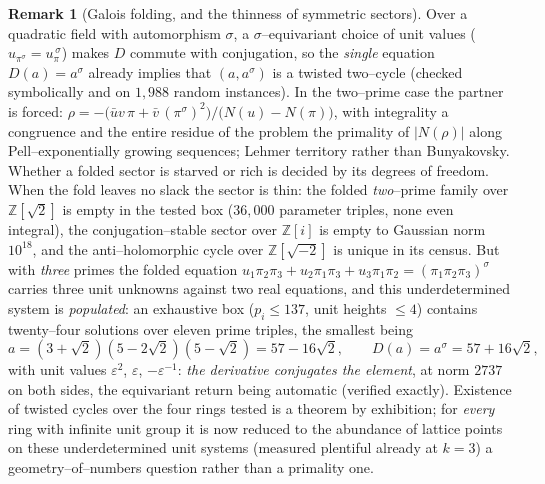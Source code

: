 \documentclass[11pt]{article}
\theoremstyle{definition}
\newtheorem{remark}[theorem]{Remark}
\begin{document}
\begin{remark}[Galois folding, and the thinness of symmetric sectors]\label{rem:folding}
Over a quadratic field with automorphism $\sigma$, a $\sigma$--equivariant choice of unit values
($u_{\pi^\sigma}=u_\pi^{\,\sigma}$) makes $D$ commute with conjugation, so the \emph{single} equation
$D(a)=a^\sigma$ already implies that $(a,a^\sigma)$ is a twisted two--cycle (checked symbolically and on
$1{,}988$ random instances). In the two--prime case the partner is forced:
$\rho=-\bigl(\bar u v\,\pi+\bar v\,(\pi^\sigma)^2\bigr)/\bigl(N(u)-N(\pi)\bigr)$, with integrality a
congruence and the entire residue of the problem the primality of $|N(\rho)|$ along Pell--exponentially
growing sequences; Lehmer territory rather than Bunyakovsky. Whether a folded sector is starved or
rich is decided by its degrees of freedom. When the fold leaves no slack the sector is thin: the folded
\emph{two}--prime family over $\mathbb{Z}[\sqrt2]$ is empty in the tested box ($36{,}000$ parameter
triples, none even integral), the conjugation--stable sector over $\mathbb{Z}[i]$ is empty to Gaussian
norm $10^{18}$, and the anti--holomorphic cycle over $\mathbb{Z}[\sqrt{-2}]$ is unique in its census.
But with \emph{three} primes the folded equation
$u_1\pi_2\pi_3+u_2\pi_1\pi_3+u_3\pi_1\pi_2=(\pi_1\pi_2\pi_3)^\sigma$ carries three unit unknowns against
two real equations, and this underdetermined system is \emph{populated}: an exhaustive box ($p_i\le137$,
unit heights $\le4$) contains twenty--four solutions over eleven prime triples, the smallest being
\[ a=(3+\sqrt2)(5-2\sqrt2)(5-\sqrt2)=57-16\sqrt2,\qquad D(a)=a^\sigma=57+16\sqrt2, \]
with unit values $\varepsilon^2$, $\varepsilon$, $-\varepsilon^{-1}$: \emph{the derivative conjugates the
element}, at norm $2737$ on both sides, the equivariant return being automatic (verified exactly).
Existence of twisted cycles over the four rings tested is a theorem by exhibition; for \emph{every} ring
with infinite unit group it is now reduced to the abundance of lattice points on these underdetermined
unit systems (measured plentiful already at $k=3$) a geometry--of--numbers question rather than a
primality one.
\end{remark}
\end{document}
